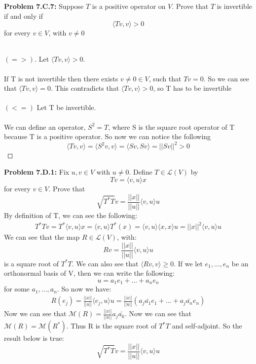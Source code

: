 \documentclass[12pt]{article}
\begin{document}
\noindent \textbf{Problem 7.C.7: }Suppose $T$ is a positive operator on $V$. Prove that $T$ is invertible if and
only if
	$$
	\langle Tv,v \rangle > 0  
	$$
for every $v \in V$, with $v \not = 0$
\\ \\
	\begin{proof}[$(=>)$]
		Let $\langle Tv,v \rangle > 0$. 
		\\ \\
		If T is not invertible then there exists $v \not = 0 \in V$, such that $Tv = 0$. So we can see that $\langle Tv, v \rangle = 0$. This contradicts that $\langle Tv,v \rangle > 0$, so T has to be invertible
		\\ \\
		$(<=)$ Let T be invertible.
		\\ \\
		We can define an operator, $S^2 = T$, where S is the square root operator of T because T is a positive operator. So now we can notice the following
			$$
			\langle Tv,v \rangle = \langle S^2v,v \rangle = \langle Sv,Sv \rangle = ||Sv||^2 > 0
			$$
	\end{proof}

\newpage 

\noindent \textbf{Problem 7.D.1: }Fix $u,v \in V$ with $u \not= 0$. Define $T \in \mathcal{L}(V)$ by
	$$
	Tv = \langle v,u \rangle x
	$$
for every $v \in V$. Prove that 
	$$
	\sqrt{T^*T}v = \frac{||x||}{||u||}\langle v,u \rangle u
	$$
By definition of T, we can see the following:
	\begin{align*}
		T^*Tv = T^*\langle v,u \rangle x = \langle v,u \rangle T^*(x) = \langle v,u \rangle \langle x,x \rangle u = ||x||^2 \langle v,u \rangle u
	\end{align*}
We can see that the map $R \in \mathcal{L}(V)$, with:
	$$
	Rv = \frac{||x||}{||u||}\langle v,u \rangle u
	$$
is a square root of $T^*T$. We can also see that $\langle Rv,v \rangle \geq 0$.  If we let $e_1, ...,e_n$ be an orthonormal basis of V, then we can write the following:
	$$
	u = a_1e_1 + ... + a_ne_n
	$$
for some $a_1, ..., a_n$. So now we have: 
	\begin{align*}
		R(e_j) = \frac{||x||}{||u||}\langle e_j,u \rangle u = \frac{||x||}{||u||}\left(a_j\bar{a_1}e_1 + ... + a_j\bar{a_n}e_n \right)
	\end{align*}
Now we can see that $\mathcal{M}(R) = \frac{||x||}{||u||}a_j\bar{a_k}$. Now we can see that $\mathcal{M}(R) = \mathcal{M}(R^*)$.  Thus R is the square root of $T^*T$ and self-adjoint.  So the result below is true:
	$$
	\sqrt{T^*T}v = \frac{||x||}{||u||}\langle v,u \rangle u
	$$ 
\end{document}
